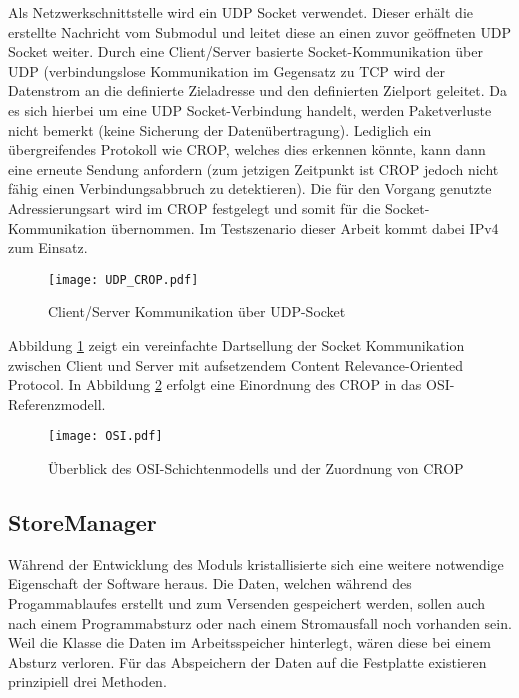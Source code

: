 Als Netzwerkschnittstelle wird ein \gls{UDP} Socket verwendet. Dieser erh{\"a}lt die
erstellte Nachricht vom Submodul  und leitet diese an einen
zuvor ge{\"o}ffneten \gls{UDP} Socket weiter. Durch eine Client/Server basierte
Socket-Kommunikation {\"u}ber \gls{UDP} (verbindungslose Kommunikation im Gegensatz
zu \gls{TCP} wird der Datenstrom an die definierte Zieladresse und den
definierten Zielport geleitet. Da es sich hierbei um eine \gls{UDP} Socket-Verbindung handelt,
werden Paketverluste nicht bemerkt (keine Sicherung der Daten{\"u}bertragung).
Lediglich ein {\"u}bergreifendes Protokoll wie \gls{CROP}, welches dies erkennen
k{\"o}nnte, kann dann eine erneute Sendung anfordern (zum jetzigen Zeitpunkt
ist \gls{CROP} jedoch nicht f{\"a}hig einen Verbindungsabbruch zu detektieren). Die
f{\"u}r den Vorgang genutzte Adressierungsart wird im \gls{CROP} festgelegt
und somit f{\"u}r die Socket-Kommunikation {\"u}bernommen. Im Testszenario
dieser Arbeit kommt dabei IPv4 zum Einsatz.

\begin{figure}[H]
\centering
\texttt{[image: UDP\_CROP.pdf]}
\caption{Client/Server Kommunikation {\"u}ber UDP-Socket}
\label{fig:Socket-Kommunikation}
\end{figure}

Abbildung \ref{fig:Socket-Kommunikation} zeigt ein vereinfachte Dartsellung der
Socket Kommunikation zwischen Client und Server mit aufsetzendem Content
Relevance-Oriented Protocol. In Abbildung \ref{fig:OSI} erfolgt eine Einordnung
des \gls{CROP} in das OSI-Referenzmodell.

\begin{figure}[H]
\centering
\texttt{[image: OSI.pdf]}
\caption{{\"U}berblick des OSI-Schichtenmodells und der Zuordnung von CROP}
\label{fig:OSI}
\end{figure}



\subsection{StoreManager}

W{\"a}hrend der Entwicklung des Moduls  kristallisierte sich eine
weitere notwendige Eigenschaft der Software heraus.
Die Daten, welchen w{\"a}hrend des Progammablaufes erstellt und zum Versenden
gespeichert werden, sollen auch nach einem Programmabsturz oder nach einem
Stromausfall noch vorhanden sein. Weil die Klasse 
die Daten im Arbeitsspeicher hinterlegt, w{\"a}ren diese bei einem Absturz
verloren.
F{\"u}r das Abspeichern der Daten auf die Festplatte existieren prinzipiell drei Methoden.

